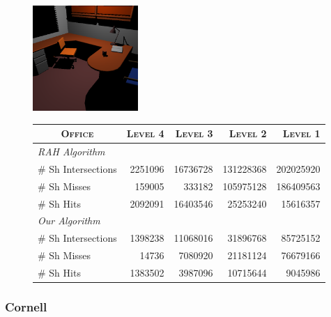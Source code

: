     
\begin{figure}[!htb]
    \begin{minipage}{0.25\linewidth}
        \centering
        \includegraphics[width=4.0cm]{Images/Office_Preview}
    \end{minipage}
    \begin{minipage}{0.725\linewidth}
        \centering
        \fontsize{8}{10}
        \selectfont
        \begin{tabular}[h]{l|rrrr}
            \multicolumn{1}{c|}{\textsc{Office}} & \textsc{Level 4} & \textsc{Level 3} & \textsc{Level 2} & \textsc{Level 1}\\
            \hline
            \emph{RAH Algorithm} & & \\
            \hline
            \quad \# Sh Intersections  & 2251096    & 16736728	& 131228368	& 202025920	\\
            \quad \# Sh Misses         & 159005		& 333182	& 105975128	& 186409563	\\
            \quad \# Sh Hits           & 2092091	& 16403546	& 25253240	& 15616357	\\
            \hline
            \emph{Our Algorithm} & & \\
            \hline
            \quad \# Sh Intersections  & 1398238	& 11068016	& 31896768	& 85725152	\\
            \quad \# Sh Misses         & 14736		& 7080920	& 21181124	& 76679166	\\
            \quad \# Sh Hits           & 1383502	& 3987096	& 10715644	& 9045986	\\
        \end{tabular}
        \label{table:office-d8-n4-results}
    \end{minipage}
\end{figure}

\subsubsection{Cornell}


